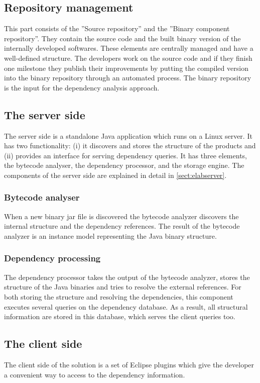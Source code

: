 \subsection{Repository management}
This part consists of the ''Source repository'' and the ''Binary component
repository''. They contain the source code and the built binary version of
the internally developed softwares. These elements are centrally managed and
have a well-defined structure. The developers work on the source code and if
they finish one milestone they publish their improvements by putting the
compiled version into the binary repository through an automated process.
The binary repository is the input for the dependency analysis approach.

\subsection{The server side}
The server side is a standalone Java application which runs on a Linux server.
It has two functionality: (i) it discovers and stores the structure of the
products and (ii) provides an interface for serving dependency queries. It has three
elements, the bytecode analyser, the dependency processor, and the storage engine.
The components of the server side are explained in detail in \autoref{sect:elabserver}.

\subsubsection{Bytecode analyser}
When a new binary jar file is discovered the bytecode analyzer  discovers the
internal structure and the dependency references. The result of the bytecode
analyzer is an instance model representing the Java binary structure.

\subsubsection{Dependency processing}
The dependency processor takes the output of the bytecode analyzer, stores the 
structure of the Java binaries and tries to resolve the external references.
For both storing the structure and resolving the dependencies, this component
executes several queries on the dependency database. As a result, all structural
information are stored in this database, which serves the client queries too.


\subsection{The client side}
The client side of the solution is a set of Eclipse plugins which give the
developer a convenient way to access to the dependency information. 

